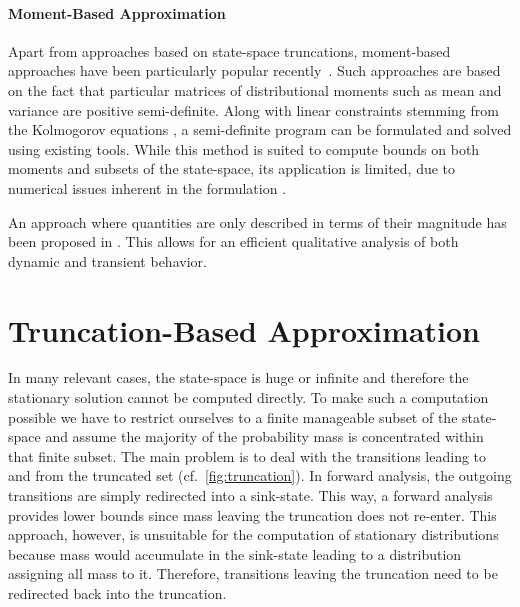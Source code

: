 \paragraph{Moment-Based Approximation}
Apart from approaches based on state-space truncations, moment-based
approaches have been particularly popular
recently~\parencite{ghusinga2017exact,dowdy2018bounds,kuntz2017rigorous,sakurai2017convex}.
Such approaches are based on the fact that particular matrices of
distributional moments such as mean and variance are positive semi-definite.
Along with linear constraints stemming from the Kolmogorov equations
\parencite{backenkohler2016generalized}, a semi-definite program can
be formulated and solved using existing tools.
While this method is suited to compute bounds on both moments and
subsets of the state-space, its application is limited, due to
numerical issues inherent in the formulation \parencite{dowdy2018bounds}.

An approach where quantities are only described in terms of their
magnitude has been proposed in \citet{ceska2019semi}. This allows for
an efficient qualitative analysis of both dynamic and transient behavior.

\section{Truncation-Based Approximation}\label{sec:statagg:fsp}
In many relevant cases, the state-space is huge or infinite and
therefore the stationary solution cannot be computed directly.
To make such a computation possible we have to restrict ourselves to
a finite manageable subset of the state-space and assume the majority
of the probability mass is concentrated within that finite subset.
The main problem is to deal with the transitions leading to and from
the truncated set (cf.\ \autoref{fig:truncation}).
In forward analysis, the outgoing transitions are simply redirected
into a sink-state.
This way, a forward analysis provides lower bounds since mass leaving
the truncation does not re-enter.
This approach, however, is unsuitable for the computation of
stationary distributions because mass would accumulate in the
sink-state leading to a distribution assigning all mass to it.
Therefore, transitions leaving the truncation need to be redirected
back into the truncation.

